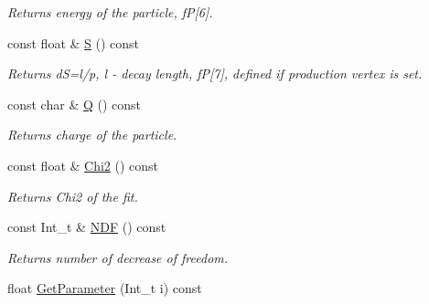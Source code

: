 \begin{DoxyCompactItemize}
\begin{DoxyCompactList}\small\item\em Returns energy of the particle, fP\mbox{[}6\mbox{]}. \end{DoxyCompactList}\item 
const float \& \hyperlink{classKFParticleBase_af9ce6c2176599a02337b472064232841}{S} () const \hypertarget{classKFParticleBase_af9ce6c2176599a02337b472064232841}{}\label{classKFParticleBase_af9ce6c2176599a02337b472064232841}

\begin{DoxyCompactList}\small\item\em Returns dS=l/p, l -\/ decay length, fP\mbox{[}7\mbox{]}, defined if production vertex is set. \end{DoxyCompactList}\item 
const char \& \hyperlink{classKFParticleBase_ae4a7bf3ab7512c1ac0110e5c405334c9}{Q} () const \hypertarget{classKFParticleBase_ae4a7bf3ab7512c1ac0110e5c405334c9}{}\label{classKFParticleBase_ae4a7bf3ab7512c1ac0110e5c405334c9}

\begin{DoxyCompactList}\small\item\em Returns charge of the particle. \end{DoxyCompactList}\item 
const float \& \hyperlink{classKFParticleBase_a970ce088efb9242fd80f3936418cbf71}{Chi2} () const \hypertarget{classKFParticleBase_a970ce088efb9242fd80f3936418cbf71}{}\label{classKFParticleBase_a970ce088efb9242fd80f3936418cbf71}

\begin{DoxyCompactList}\small\item\em Returns Chi2 of the fit. \end{DoxyCompactList}\item 
const Int\+\_\+t \& \hyperlink{classKFParticleBase_ac64a15a8896f19ff55412e9e6be60bae}{N\+DF} () const \hypertarget{classKFParticleBase_ac64a15a8896f19ff55412e9e6be60bae}{}\label{classKFParticleBase_ac64a15a8896f19ff55412e9e6be60bae}

\begin{DoxyCompactList}\small\item\em Returns number of decrease of freedom. \end{DoxyCompactList}\item 
float \hyperlink{classKFParticleBase_a73a492eea1644b514e874bbe77543c3a}{Get\+Parameter} (Int\+\_\+t i) const \hypertarget{classKFParticleBase_a73a492eea1644b514e874bbe77543c3a}{}\label{classKFParticleBase_a73a492eea1644b514e874bbe77543c3a}


\end{DoxyCompactItemize}
